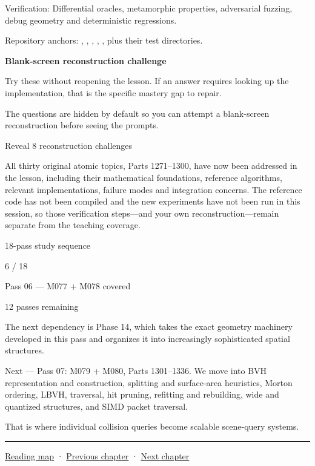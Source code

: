 Verification: Differential oracles, metamorphic properties, adversarial fuzzing, debug geometry and deterministic regressions.

Repository anchors: , , , , , plus their test directories.

\textbf{Blank-screen reconstruction challenge}

Try these without reopening the lesson. If an answer requires looking up the implementation, that is the specific mastery gap to repair.

The questions are hidden by default so you can attempt a blank-screen reconstruction before seeing the prompts.

Reveal 8 reconstruction challenges

All thirty original atomic topics, Parts 1271--1300, have now been addressed in the lesson, including their mathematical foundations, reference algorithms, relevant implementations, failure modes and integration concerns. The reference code has not been compiled and the new experiments have not been run in this session, so those verification steps---and your own reconstruction---remain separate from the teaching coverage.

18-pass study sequence

6 / 18

Pass 06 --- M077 + M078 covered

12 passes remaining

The next dependency is Phase 14, which takes the exact geometry machinery developed in this pass and organizes it into increasingly sophisticated spatial structures.

Next --- Pass 07: M079 + M080, Parts 1301--1336. We move into BVH representation and construction, splitting and surface-area heuristics, Morton ordering, LBVH, traversal, hit pruning, refitting and rebuilding, wide and quantized structures, and SIMD packet traversal.

That is where individual collision queries become scalable scene-query systems.

\begin{center}\rule{0.5\linewidth}{0.5pt}\end{center}

\hyperref[volume-reading-map]{Reading map} · \hyperref[04-visual-computing-ii-ch026-contact-features-and-manifolds]{Previous chapter} · \hyperref[04-visual-computing-ii-ch028-visibility-queries-and-ray-intersections]{Next chapter}
